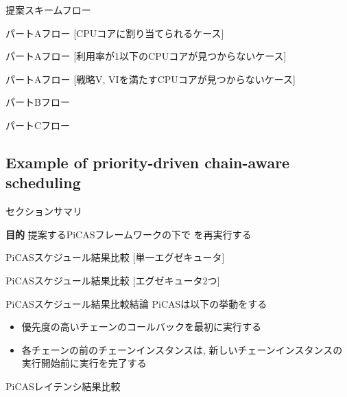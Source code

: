 \begin{frame}{提案スキームフロー}
\end{frame}

\begin{frame}{パートAフロー [CPUコアに割り当てられるケース]}
\end{frame}

\begin{frame}{パートAフロー [利用率が1以下のCPUコアが見つからないケース]}
\end{frame}

\begin{frame}{パートAフロー [戦略V, VIを満たすCPUコアが見つからないケース]}
\end{frame}

\begin{frame}{パートBフロー}
\end{frame}

\begin{frame}{パートCフロー}
\end{frame}


\subsection{Example of priority-driven chain-aware scheduling}
\label{ssec: example of priority-driven chain-aware scheduling}

\begin{frame}{セクションサマリ}
    \begin{itembox}[l]{\textbf{目的}}
        提案するPiCASフレームワークの下で  を再実行する
    \end{itembox}
\end{frame}

\begin{frame}{PiCASスケジュール結果比較 [単一エグゼキュータ]}
\end{frame}

\begin{frame}{PiCASスケジュール結果比較 [エグゼキュータ2つ]}
\end{frame}

\begin{frame}{PiCASスケジュール結果比較結論}
    PiCASは以下の挙動をする
    \begin{itemize}
        \item 優先度の高いチェーンのコールバックを最初に実行する
        \item 各チェーンの前のチェーンインスタンスは, 新しいチェーンインスタンスの実行開始前に実行を完了する
    \end{itemize}
\end{frame}

\begin{frame}{PiCASレイテンシ結果比較}
\end{frame}
